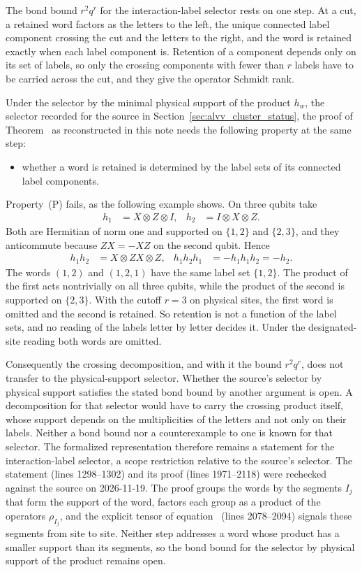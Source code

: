 \documentclass{article}
\begin{document}
The bond bound $r^2q^r$ for the interaction-label selector rests on one
step. At a cut, a retained word factors as the letters to the left, the
unique connected label component crossing the cut and the letters to the
right, and the word is retained exactly when each label component is.
Retention of a component depends only on its set of labels, so only the
crossing components with fewer than $r$ labels have to be carried across
the cut, and they give the operator Schmidt rank.

Under the selector by the minimal physical support of the product
$h_w$, the selector recorded for the source in
Section~\ref{sec:alvv_cluster_status}, the proof of
Theorem~ as reconstructed in this note needs the following
property at the same step:
\begin{itemize}
    \item[(P)] whether a word is retained is determined by the label sets
          of its connected label components.
\end{itemize}
Property~(P) fails, as the following example shows. On three qubits take
\begin{align}
    h_1 & =X\otimes Z\otimes I, & h_2 & =I\otimes X\otimes Z.
\end{align}
Both are Hermitian of norm one and supported on $\{1,2\}$ and $\{2,3\}$, and
they anticommute because $ZX=-XZ$ on the second qubit. Hence
\begin{align}
    h_1h_2   & =X\otimes ZX\otimes Z, &
    h_1h_2h_1 & =-h_1h_1h_2=-h_2.
\end{align}
The words $(1,2)$ and $(1,2,1)$ have the same label set $\{1,2\}$. The
product of the first acts nontrivially on all three qubits, while the
product of the second is supported on $\{2,3\}$. With the cutoff $r=3$ on
physical sites, the first word is omitted and the second is retained. So
retention is not a function of the label sets, and no reading of the labels
letter by letter decides it. Under the designated-site reading both words
are omitted.

Consequently the crossing decomposition, and with it the bound $r^2q^r$,
does not transfer to the physical-support selector. Whether the source's
selector by physical support satisfies the stated bond bound by another
argument is open. A decomposition
for that selector would have to carry the crossing product itself, whose
support depends on the multiplicities of the letters and not only on their
labels. Neither a bond bound nor a counterexample to one is known for that
selector. The formalized representation therefore remains a statement for
the interaction-label selector, a scope restriction relative to the source's
selector. The statement (lines 1298--1302) and its proof (lines 1971--2118)
were rechecked against the source on 2026-11-19. The proof groups the words
by the segments $I_j$ that form the support of the word, factors each group
as a product of the operators $\rho_{I_j}$, and the explicit tensor of
equation~ (lines 2078--2094) signals these segments from
site to site. Neither step addresses a word whose product has a smaller
support than its segments, so the bond bound for the selector by physical
support of the product remains open.
\end{document}
